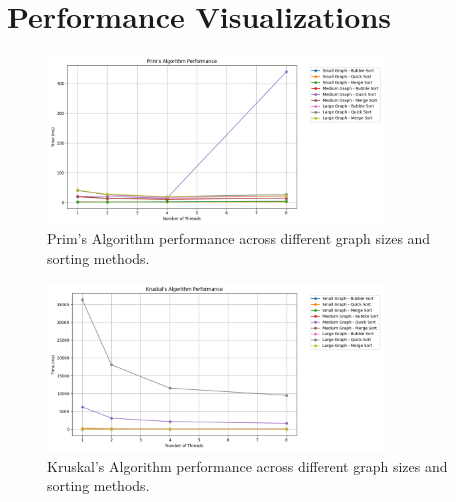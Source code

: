 \documentclass[11pt]{article}
\begin{document}
\begin{table}[H]
    \centering
    \caption{Sequential performance for Large Graph (1500V, 50000E).}
    \label{tab:large_seq}
\end{table}

\section{Performance Visualizations}
\begin{figure}[H]
    \centering
    \includegraphics[width=0.8\textwidth]{prims_comparison.png}
    \caption{Prim's Algorithm performance across different graph sizes and sorting methods.}
    \label{fig:prims_comparison}
\end{figure}

\begin{figure}[H]
    \centering
    \includegraphics[width=0.8\textwidth]{kruskals_comparison.png}
    \caption{Kruskal's Algorithm performance across different graph sizes and sorting methods.}
    \label{fig:kruskals_comparison}
\end{figure}
\end{document}
